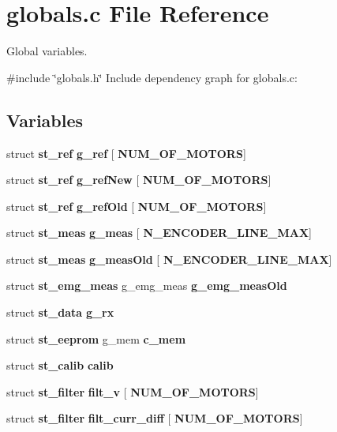 \section{globals.\+c File Reference}
\label{globals_8c}


Global variables.  


{\ttfamily \#include \char`\"{}globals.\+h\char`\"{}}\newline
Include dependency graph for globals.\+c\+:
\subsection*{Variables}
\begin{DoxyCompactItemize}
\item 
\mbox{\label{globals_8c_a975e5cde4f157d8bbdbde3c03227f3de}} 
struct \textbf{ st\+\_\+ref} {\bfseries g\+\_\+ref} [\textbf{ N\+U\+M\+\_\+\+O\+F\+\_\+\+M\+O\+T\+O\+RS}]
\item 
\mbox{\label{globals_8c_ab40c607c340b011a96046994f4b2229c}} 
struct \textbf{ st\+\_\+ref} {\bfseries g\+\_\+ref\+New} [\textbf{ N\+U\+M\+\_\+\+O\+F\+\_\+\+M\+O\+T\+O\+RS}]
\item 
struct \textbf{ st\+\_\+ref} \textbf{ g\+\_\+ref\+Old} [\textbf{ N\+U\+M\+\_\+\+O\+F\+\_\+\+M\+O\+T\+O\+RS}]
\item 
\mbox{\label{globals_8c_a6f0c00c1300c30d398231d1e76f3f780}} 
struct \textbf{ st\+\_\+meas} {\bfseries g\+\_\+meas} [\textbf{ N\+\_\+\+E\+N\+C\+O\+D\+E\+R\+\_\+\+L\+I\+N\+E\+\_\+\+M\+AX}]
\item 
struct \textbf{ st\+\_\+meas} \textbf{ g\+\_\+meas\+Old} [\textbf{ N\+\_\+\+E\+N\+C\+O\+D\+E\+R\+\_\+\+L\+I\+N\+E\+\_\+\+M\+AX}]
\item 
struct \textbf{ st\+\_\+emg\+\_\+meas} g\+\_\+emg\+\_\+meas \textbf{ g\+\_\+emg\+\_\+meas\+Old}
\item 
struct \textbf{ st\+\_\+data} \textbf{ g\+\_\+rx}
\item 
struct \textbf{ st\+\_\+eeprom} g\+\_\+mem \textbf{ c\+\_\+mem}
\item 
struct \textbf{ st\+\_\+calib} \textbf{ calib}
\item 
\mbox{\label{globals_8c_a0e9a576515332f8bd83ae6a2fe0164aa}} 
struct \textbf{ st\+\_\+filter} {\bfseries filt\+\_\+v} [\textbf{ N\+U\+M\+\_\+\+O\+F\+\_\+\+M\+O\+T\+O\+RS}]
\item 
\mbox{\label{globals_8c_a503852d956ef1e03f4a9d8b91db248fc}} 
struct \textbf{ st\+\_\+filter} {\bfseries filt\+\_\+curr\+\_\+diff} [\textbf{ N\+U\+M\+\_\+\+O\+F\+\_\+\+M\+O\+T\+O\+RS}]

\end{DoxyCompactItemize}
